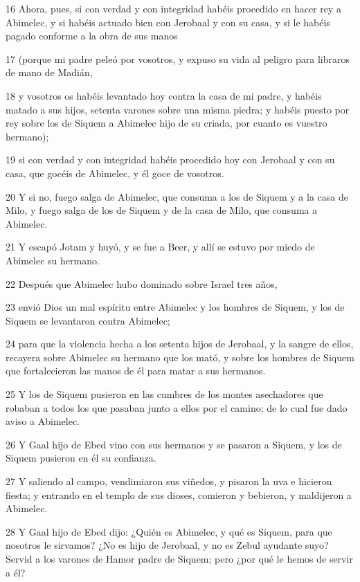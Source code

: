 \par 16 Ahora, pues, si con verdad y con integridad habéis procedido en hacer rey a Abimelec, y si habéis actuado bien con Jerobaal y con su casa, y si le habéis pagado conforme a la obra de sus manos
\par 17 (porque mi padre peleó por vosotros, y expuso su vida al peligro para libraros de mano de Madián,
\par 18 y vosotros os habéis levantado hoy contra la casa de mi padre, y habéis matado a sus hijos, setenta varones sobre una misma piedra; y habéis puesto por rey sobre los de Siquem a Abimelec hijo de su criada, por cuanto es vuestro hermano);
\par 19 si con verdad y con integridad habéis procedido hoy con Jerobaal y con su casa, que gocéis de Abimelec, y él goce de vosotros.
\par 20 Y si no, fuego salga de Abimelec, que consuma a los de Siquem y a la casa de Milo, y fuego salga de los de Siquem y de la casa de Milo, que consuma a Abimelec.
\par 21 Y escapó Jotam y huyó, y se fue a Beer, y allí se estuvo por miedo de Abimelec su hermano.
\par 22 Después que Abimelec hubo dominado sobre Israel tres años,
\par 23 envió Dios un mal espíritu entre Abimelec y los hombres de Siquem, y los de Siquem se levantaron contra Abimelec;
\par 24 para que la violencia hecha a los setenta hijos de Jerobaal, y la sangre de ellos, recayera sobre Abimelec su hermano que los mató, y sobre los hombres de Siquem que fortalecieron las manos de él para matar a sus hermanos.
\par 25 Y los de Siquem pusieron en las cumbres de los montes asechadores que robaban a todos los que pasaban junto a ellos por el camino; de lo cual fue dado aviso a Abimelec.
\par 26 Y Gaal hijo de Ebed vino con sus hermanos y se pasaron a Siquem, y los de Siquem pusieron en él su confianza.
\par 27 Y saliendo al campo, vendimiaron sus viñedos, y pisaron la uva e hicieron fiesta; y entrando en el templo de sus dioses, comieron y bebieron, y maldijeron a Abimelec.
\par 28 Y Gaal hijo de Ebed dijo: ¿Quién es Abimelec, y qué es Siquem, para que nosotros le sirvamos? ¿No es hijo de Jerobaal, y no es Zebul ayudante suyo? Servid a los varones de Hamor padre de Siquem; pero ¿por qué le hemos de servir a él?
